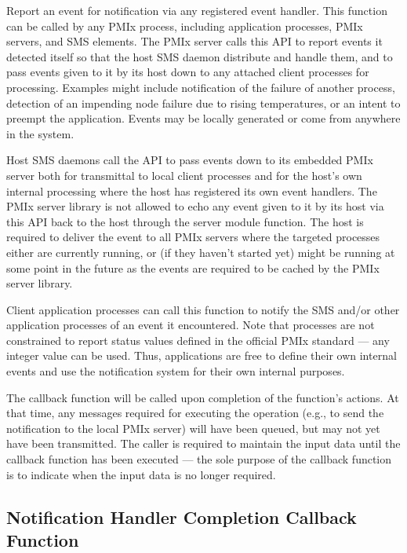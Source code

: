 \descr

Report an event for notification via any registered event handler. This function can be called by any \ac{PMIx} process, including application processes, \ac{PMIx} servers, and \ac{SMS} elements. The \ac{PMIx} server calls this \ac{API} to report events it detected itself so that the host \ac{SMS} daemon distribute and handle them, and to pass events given to it by its host down to any attached client processes for processing. Examples might include notification of the failure of another process, detection of an impending node failure due to rising temperatures, or an intent to preempt the application. Events may be locally generated or come from anywhere in the system.

Host \ac{SMS} daemons call the \ac{API} to pass events down to its embedded \ac{PMIx} server both for transmittal to local client processes and for the host's own internal processing where the host has registered its own event handlers. The \ac{PMIx} server library is not allowed to echo any event given to it by its host via this \ac{API} back to the host through the  server module function. The host is required to deliver the event to all \ac{PMIx} servers where the targeted processes either are currently running, or (if they haven't started yet) might be running at some point in the future as the events are required to be cached by the \ac{PMIx} server library.

Client application processes can call this function to notify the \ac{SMS} and/or other application processes of an event it encountered. Note that processes are not constrained to report status values defined in the official \ac{PMIx} standard --- any integer value can be used. Thus, applications are free to define their own internal events and use the notification system for their own internal purposes.

\adviceuserstart
The callback function will be called upon completion of the
 function's actions. At that time, any messages required for executing the operation (e.g., to send the notification to the local \ac{PMIx} server) will
have been queued, but may not yet have been transmitted. The caller is required to maintain the input
data until the callback function has been executed --- the sole purpose of the callback function is to indicate when the input data is no longer required.
\adviceuserend

\subsection{Notification Handler Completion Callback Function}

